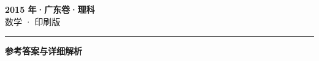 \documentclass[zihao=5, a4paper]{ctexart}
\begin{document}
\begin{center}
  {\Large\bfseries 2015 年·广东卷·理科}\\[4pt]
  {\large 数学 · 印刷版}
\end{center}
\medskip
{}

\par\bigskip\hrule\bigskip
{}
\begin{center}{\large\bfseries 参考答案与详细解析}\end{center}
\smallskip

\end{document}
